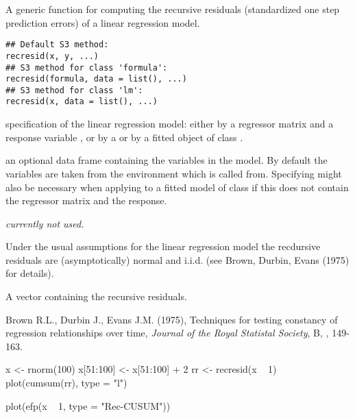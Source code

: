 \begin{Description}\relax
A generic function for computing the recursive residuals
(standardized one step prediction errors) of a linear regression model.\end{Description}
\begin{Usage}
\begin{verbatim}
## Default S3 method:
recresid(x, y, ...)
## S3 method for class 'formula':
recresid(formula, data = list(), ...)
## S3 method for class 'lm':
recresid(x, data = list(), ...)
\end{verbatim}
\end{Usage}
\begin{Arguments}
\begin{ldescription}
\item[\code{x, y, formula}] specification of the linear regression model:
either by a regressor matrix  and a response variable ,
or by a  or by a fitted object  of class .
\item[\code{data}] an optional data frame containing the variables in the model. By
default the variables are taken from the environment which  is
called from. Specifying  might also be necessary when applying
 to a fitted model of class  if this does not
contain the regressor matrix and the response.
\item[\code{...}] \emph{currently not used.}
\end{ldescription}
\end{Arguments}
\begin{Details}\relax
Under the usual assumptions for the linear regression model the
recdursive residuals are (asymptotically) normal and
i.i.d. (see Brown, Durbin, Evans (1975) for details).\end{Details}
\begin{Value}
A vector containing the recursive residuals.\end{Value}
\begin{References}\relax
Brown R.L., Durbin J., Evans J.M. (1975), Techniques for
testing constancy of regression relationships over time, \emph{Journal of the
Royal Statistal Society}, B, , 149-163.\end{References}
\begin{SeeAlso}\relax
{}\end{SeeAlso}
\begin{Examples}
\begin{ExampleCode}
x <- rnorm(100)
x[51:100] <- x[51:100] + 2
rr <- recresid(x ~ 1)
plot(cumsum(rr), type = "l")

plot(efp(x ~ 1, type = "Rec-CUSUM"))
\end{ExampleCode}
\end{Examples}

